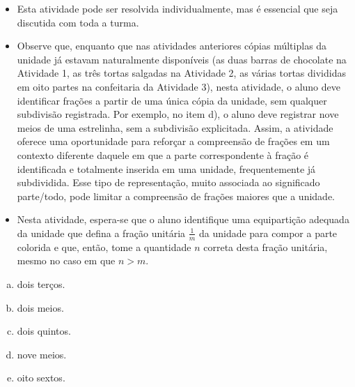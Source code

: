 \begin{multicols}{2}
\begin{orientacoes}
  \begin{itemize} %
    \item       Esta atividade pode ser resolvida individualmente, mas é essencial que seja discutida com toda a turma.
    \item       Observe que, enquanto que nas atividades anteriores cópias múltiplas da unidade já estavam naturalmente disponíveis (as duas barras de chocolate na Atividade 1, as três tortas salgadas na Atividade 2, as várias tortas divididas em oito partes na confeitaria da Atividade 3), nesta atividade, o aluno deve identificar frações a partir de uma única cópia da unidade, sem qualquer subdivisão registrada. Por exemplo, no item d), o aluno deve registrar nove meios de uma estrelinha, sem a subdivisão explicitada. Assim, a atividade oferece uma oportunidade para reforçar a compreensão de frações em um contexto diferente daquele em que a parte correspondente à fração é identificada e totalmente inserida em uma unidade, frequentemente já subdividida. Esse tipo de representação, muito associada ao significado parte/todo, pode limitar a compreensão de frações maiores que a unidade.
    \item       Nesta atividade, espera-se que o aluno identifique uma equipartição adequada da unidade que defina a fração unitária       $\frac{1}{m}$ da unidade para compor a parte colorida e que, então, tome a quantidade       $n$ correta desta fração unitária, mesmo no caso em que       $n > m$.
\end{itemize} %


\end{orientacoes}

\begin{solucao}{}{}
  \begin{enumerate}[a)]
   \item dois terços.
   \item dois meios.
   \item dois quintos.
   \item nove meios.
   \item oito sextos.
\end{enumerate}
  \end{solucao}


\end{multicols}

